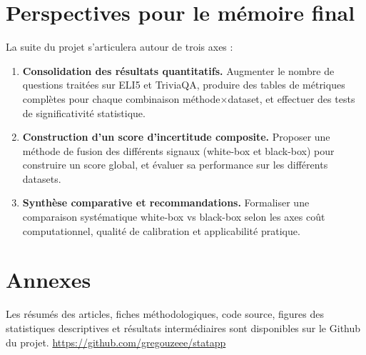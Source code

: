 \documentclass[a4paper, 11pt]{article}
\begin{document}
\section{Perspectives pour le mémoire final}
La suite du projet s'articulera autour de trois axes :
\begin{enumerate}[nosep]
    \item \textbf{Consolidation des résultats quantitatifs.} Augmenter le nombre de questions traitées sur ELI5 et TriviaQA, produire des tables de métriques complètes pour chaque combinaison méthode$\times$dataset, et effectuer des tests de significativité statistique.
    \item \textbf{Construction d'un score d'incertitude composite.} Proposer une méthode de fusion des différents signaux (white-box et black-box) pour construire un score global, et évaluer sa performance sur les différents datasets.
    \item \textbf{Synthèse comparative et recommandations.} Formaliser une comparaison systématique white-box vs black-box selon les axes coût computationnel, qualité de calibration et applicabilité pratique.
\end{enumerate}
\vfill
\section*{Annexes}
Les résumés des articles, fiches méthodologiques, code source, figures des statistiques descriptives et résultats intermédiaires sont disponibles sur le Github du projet.
\url{https://github.com/gregouzeee/statapp}
\end{document}
